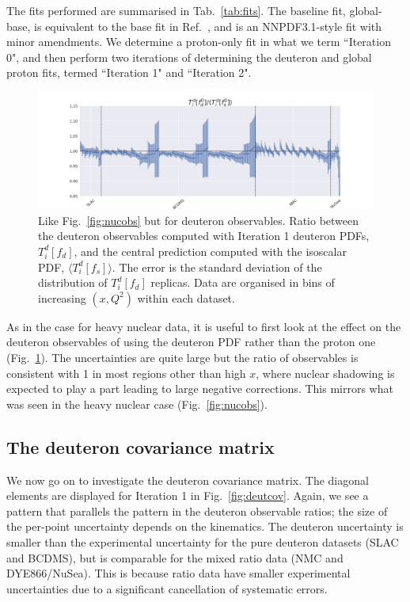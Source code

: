 The fits performed are summarised in Tab.~\ref{tab:fits}. The baseline fit, global-base, is equivalent to the base fit in Ref.~\cite{Faura:2020oom}, and is an NNPDF3.1-style fit with minor amendments. We determine a proton-only fit in what we term ``Iteration 0", and then perform two iterations of determining the deuteron and global proton fits, termed ``Iteration 1" and ``Iteration 2". 
\begin{figure}[h]
  \begin{center}
    \includegraphics[width=\linewidth, trim={4cm 0 4cm 0}]{nuclear/plots/observable_ratio_ite_1.png}
   \caption{ Like Fig.~\ref{fig:nucobs} but for deuteron observables. Ratio between the deuteron observables computed with Iteration 1 deuteron PDFs, $T_i^d[f_d]$, and the central prediction computed with the isoscalar PDF, $\langle T_i^d[f_s] \rangle$. The error is the standard deviation of the distribution of $T_i^d[f_d]$ replicas. Data are organised in bins of increasing $(x, Q^2)$ within each dataset. 
    \label{fig:deutobs} }
  \end{center}
\end{figure}

As in the case for heavy nuclear data, it is useful to first look at the effect on the deuteron observables of using the deuteron PDF rather than the proton one (Fig.~\ref{fig:deutobs}). The uncertainties are quite large but the ratio of observables is consistent with 1 in most regions other than high $x$, where nuclear shadowing is expected to play a part leading to large negative corrections. This mirrors what was seen in the heavy nuclear case (Fig.~\ref{fig:nucobs}).

\subsection{The deuteron covariance matrix}
We now go on to investigate the deuteron covariance matrix. The diagonal elements are displayed for Iteration 1 in Fig.~\ref{fig:deutcov}. Again, we see a pattern that parallels the pattern in the deuteron observable ratios; the size of the per-point uncertainty depends on the kinematics. The deuteron uncertainty is smaller than the experimental uncertainty for the  pure deuteron datasets (SLAC and BCDMS), but is comparable for the mixed ratio data (NMC and DYE866/NuSea). This is because ratio data have smaller experimental uncertainties due to a significant cancellation of systematic errors. 

